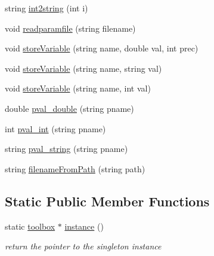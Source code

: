 \begin{DoxyCompactItemize}
\item 
string \hyperlink{classtoolbox_a4b2268cb178f0ae934f46efffda0450b}{int2string} (int i)
\item 
void \hyperlink{classtoolbox_a2b7ddff386b9bc1f790627f632fae50c}{readparamfile} (string filename)
\item 
void \hyperlink{classtoolbox_a05d6f98094e98e263806b9c7b51fac51}{store\+Variable} (string name, double val, int prec)
\item 
void \hyperlink{classtoolbox_a8f04e33d10ffe547856ded0caf3d5640}{store\+Variable} (string name, string val)
\item 
void \hyperlink{classtoolbox_a53685118cae82122f3a0d083185804b3}{store\+Variable} (string name, int val)
\item 
double \hyperlink{classtoolbox_aa6cb1dff126daa9c34d6e2435143b372}{pval\+\_\+double} (string pname)
\item 
int \hyperlink{classtoolbox_a30135dd53233f8ed0cd68532f51cb002}{pval\+\_\+int} (string pname)
\item 
string \hyperlink{classtoolbox_ad3c9eb0127e47a8ce04922646ade51fc}{pval\+\_\+string} (string pname)
\item 
string \hyperlink{classtoolbox_a67d5356e65a3e93b179f0e48f98cf41c}{filename\+From\+Path} (string path)
\end{DoxyCompactItemize}
\subsection*{Static Public Member Functions}
\begin{DoxyCompactItemize}
\item 
\hypertarget{classtoolbox_a3058e36ea4c84178eaa21321a5733cc8}{static \hyperlink{classtoolbox}{toolbox} $\ast$ \hyperlink{classtoolbox_a3058e36ea4c84178eaa21321a5733cc8}{instance} ()}\label{classtoolbox_a3058e36ea4c84178eaa21321a5733cc8}

\begin{DoxyCompactList}\small\item\em return the pointer to the singleton instance \end{DoxyCompactList}\end{DoxyCompactItemize}
